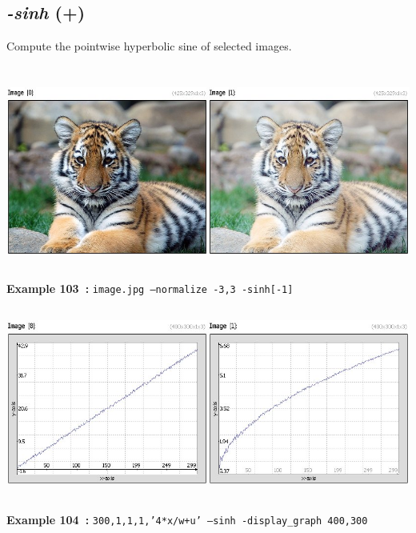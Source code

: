 \documentclass[a4paper,11pt,twoside]{book}
\begin{document}
\subsection{\emph{-sinh} (+)}\vspace*{-0.5em}
Compute the pointwise hyperbolic sine of selected images.
\begin{center}\includegraphics[keepaspectratio=true,height=7cm,width=\textwidth]{img/gmic_def103.jpg}\\
{\footnotesize \textbf{Example 103~:} \texttt{image.jpg --normalize -3,3 -sinh[-1]}}
\\\includegraphics[keepaspectratio=true,height=7cm,width=\textwidth]{img/gmic_def104.jpg}\\
{\footnotesize \textbf{Example 104~:} \texttt{300,1,1,1,'4*x/w+u' --sinh -display\_graph 400,300}}
\end{center}
\end{document}
